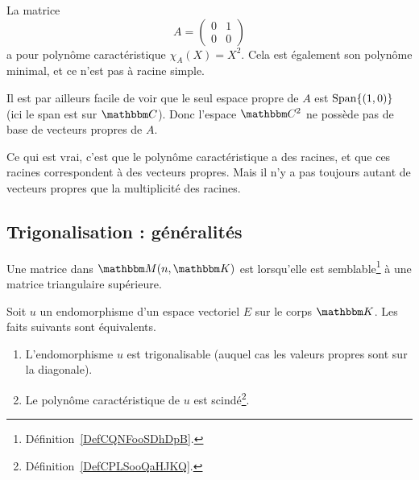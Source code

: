 \begin{example}
    La matrice
    \begin{equation}
        A=\begin{pmatrix}
            0    &   1    \\
            0    &   0
        \end{pmatrix}
    \end{equation}
    a pour polynôme caractéristique \( \chi_A(X)=X^2\). Cela est également son polynôme minimal, et ce n'est pas à racine simple.

    Il est par ailleurs facile de voir que le seul espace propre de \( A\) est \( \operatorname{Span}\{ (1,0) \}\) (ici le span est sur \( \eC\)). Donc l'espace \( \eC^2\) ne possède pas de base de vecteurs propres de \( A\).
\end{example}

Ce qui est vrai, c'est que le polynôme caractéristique a des racines, et que ces racines correspondent à des vecteurs propres. Mais il n'y a pas toujours autant de vecteurs propres que la multiplicité des racines.

\subsection{Trigonalisation : généralités}

\begin{definition}
    Une matrice dans \( \eM(n,\eK)\) est  lorsqu'elle est semblable\footnote{Définition~\ref{DefCQNFooSDhDpB}.} à une matrice triangulaire supérieure.
\end{definition}

\begin{proposition} \label{PropKNVFooQflQsJ}
    Soit \( u\) un endomorphisme d'un espace vectoriel \( E\) sur le corps \( \eK\). Les faits suivants sont équivalents.
    \begin{enumerate}
        \item   \label{ItemZKDMooOrTHkwi}
            L'endomorphisme \( u\) est trigonalisable (auquel cas les valeurs propres sont sur la diagonale).
        \item   \label{ItemZKDMooOrTHkwii}
            Le polynôme caractéristique de \( u\) est scindé\footnote{Définition~\ref{DefCPLSooQaHJKQ}.}.
    \end{enumerate}
\end{proposition}

